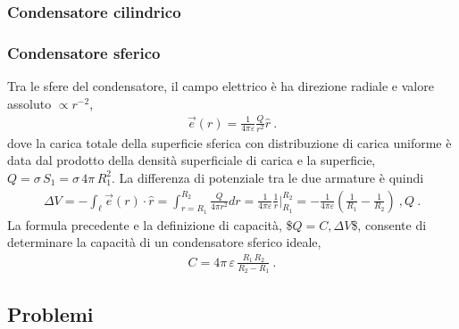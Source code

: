 \documentclass[letterpaper,10pt,italian]{jupyterBook}
\begin{document}
\subsubsection*{Condensatore cilindrico}

\sphinxAtStartPar
{}
\subsubsection*{Condensatore sferico}

\sphinxAtStartPar
Tra le sfere del condensatore, il campo elettrico è ha direzione radiale e valore assoluto \(\propto r^{-2}\),
\begin{equation*}
\begin{split}\vec{e}(r) = \frac{1}{4 \pi \varepsilon} \frac{Q}{r^2} \hat{r} \ .\end{split}
\end{equation*}
\sphinxAtStartPar
dove la carica totale della superficie sferica con distribuzione di carica uniforme è data dal prodotto della densità superficiale di carica e la superficie, \(Q = \sigma \, S_1 = \sigma \, 4 \pi \, R_1^2\).
La differenza di potenziale tra le due armature è quindi
\begin{equation*}
\begin{split}\Delta V = - \int_{\ell} \vec{e}(r) \cdot \hat{r} = \int_{r=R_1}^{R_2} \frac{Q}{4 \pi r^2} dr = \frac{1}{4 \pi \varepsilon} \frac{1}{r} \bigg|_{R_1}^{R_2} = - \frac{1}{4 \pi \varepsilon} \left(\frac{1}{R_1} - \frac{1}{R_2} \right) \ , Q \ .\end{split}
\end{equation*}
\sphinxAtStartPar
La formula precedente e la definizione di capacità, \$\(Q = C , \Delta V\)\$, consente di determinare la capacità di un condensatore sferico ideale,
\begin{equation*}
\begin{split}C = 4 \pi \, \varepsilon \,  \frac{R_1 \, R_2}{R_2 - R_1} \ .\end{split}
\end{equation*}


\sphinxstepscope


\subsection{Problemi}
\label{\detokenize{ch/electromagnetism/electrostatics-problems:problemi}}\label{\detokenize{ch/electromagnetism/electrostatics-problems:physics-hs-electromagnetism-electrostatics-problems}}\label{\detokenize{ch/electromagnetism/electrostatics-problems::doc}} \label{exercise:ch/electromagnetism/electrostatics-problems-exercise-0}
\end{document}
